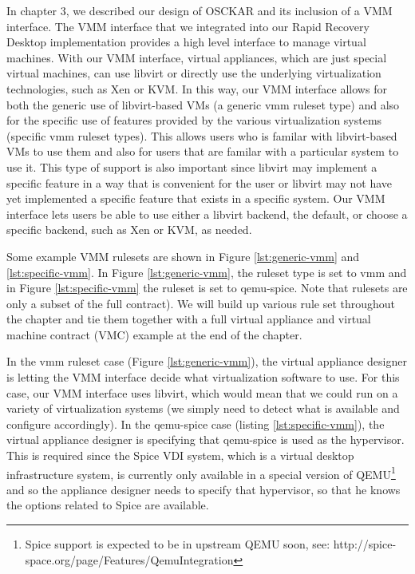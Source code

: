 In chapter 3, we described our design of OSCKAR and its inclusion of a VMM interface. The VMM interface that we integrated into our Rapid Recovery Desktop implementation provides a high level interface to manage virtual machines. With our VMM interface, virtual appliances, which are just special virtual machines, can use libvirt or directly use the underlying virtualization technologies, such as Xen or KVM. In this way, our VMM interface allows for both the generic use of libvirt-based VMs (a generic vmm ruleset type) and also for the specific use of features provided by the various virtualization systems (specific vmm ruleset types). This allows users who is familar with libvirt-based VMs to use them and also for users that are familar with a particular system to use it. This type of support is also important since libvirt may implement a specific feature in a way that is convenient for the user or libvirt may not have yet implemented a specific feature that exists in a specific system. Our VMM interface lets users be able to use either a libvirt backend, the default, or choose a specific backend, such as Xen or KVM, as needed. 

Some example VMM rulesets are shown in Figure \ref{lst:generic-vmm} and \ref{lst:specific-vmm}. In Figure \ref{lst:generic-vmm}, the ruleset type is set to vmm and in Figure \ref{lst:specific-vmm} the ruleset is set to qemu-spice.  Note that rulesets are only a subset of the full contract). We will build up various rule set throughout the chapter and tie them together with a full virtual appliance and virtual machine contract (VMC) example at the end of the chapter.

In the vmm ruleset case (Figure \ref{lst:generic-vmm}), the virtual appliance designer is letting the VMM interface decide what virtualization software to use. For this case, our VMM interface uses libvirt, which would mean that we could run on a variety of virtualization systems (we simply need to detect what is available and configure accordingly). In the qemu-spice case (listing \ref{lst:specific-vmm}), the virtual appliance designer is specifying that qemu-spice is used as the hypervisor. This is required since the Spice VDI system, which is a virtual desktop infrastructure system, is currently only available in a special version of QEMU\footnote{Spice support is expected to be in upstream QEMU soon, see: http://spice-space.org/page/Features/QemuIntegration} and so the appliance designer needs to specify that hypervisor, so that he knows the options related to Spice are available.

